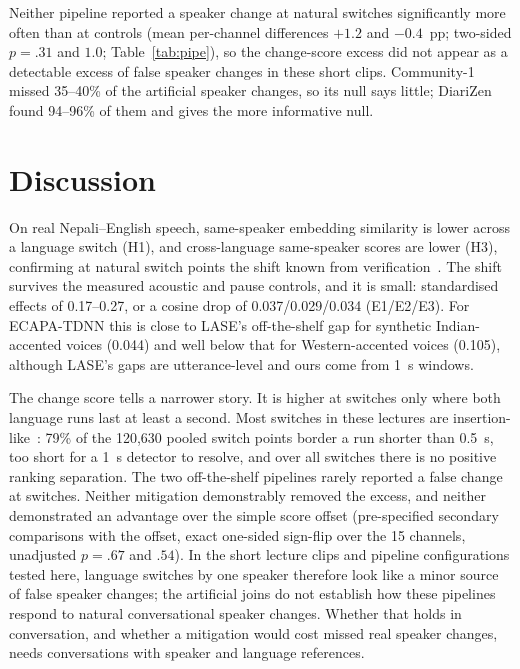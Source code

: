\documentclass[conference]{IEEEtran}
\begin{document}
Neither pipeline reported a speaker change at natural switches significantly more often
than at controls (mean per-channel differences $+1.2$ and $-0.4$~pp; two-sided $p=.31$ and
$1.0$; Table~\ref{tab:pipe}), so the change-score excess did not appear as a detectable
excess of false speaker changes in these short clips. Community-1 missed 35--40\% of the
artificial speaker changes, so its null says little; DiariZen found 94--96\% of them and
gives the more informative null.

\section{Discussion}
\label{sec:discussion}
On real Nepali--English speech, same-speaker embedding similarity is lower across a
language switch (H1), and cross-language same-speaker scores are lower (H3), confirming at
natural switch points the shift known from verification~\cite{thienpondt2022,menta2026lase}.
The shift survives the measured acoustic and pause controls, and it is small: standardised
effects of 0.17--0.27, or a cosine drop of 0.037/0.029/0.034 (E1/E2/E3). For ECAPA-TDNN this
is close to LASE's off-the-shelf gap for synthetic Indian-accented voices (0.044) and well
below that for Western-accented voices (0.105), although LASE's gaps are utterance-level and
ours come from 1~s windows.

The change score tells a narrower story. It is higher at switches only where both language
runs last at least a second. Most switches in these lectures are
insertion-like~\cite{muysken2000}: 79\% of the 120{,}630 pooled switch points border a run
shorter than 0.5~s, too short for a 1~s detector to resolve, and over all switches there is no positive ranking separation. The two off-the-shelf pipelines rarely reported a false change at
switches. Neither mitigation demonstrably removed the excess, and neither demonstrated an advantage over the simple score offset (pre-specified secondary comparisons with the offset, exact one-sided sign-flip over the 15 channels, unadjusted $p=.67$ and $.54$). In the short lecture clips and pipeline configurations tested here, language switches by one speaker therefore look like a minor source of false speaker changes; the artificial joins do not establish how these pipelines respond to natural conversational speaker changes. Whether that holds in conversation, and whether
a mitigation would cost missed real speaker changes, needs conversations with speaker and
language references.
\end{document}
